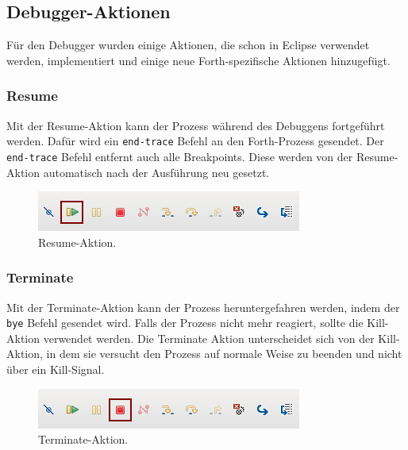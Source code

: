 \subsection{Debugger-Aktionen}

Für den Debugger wurden einige Aktionen, die schon in Eclipse verwendet werden, implementiert und einige neue Forth-spezifische Aktionen hinzugefügt.

\subsubsection{Resume}

Mit der Resume-Aktion kann der Prozess während des Debuggens fortgeführt werden. Dafür wird ein \verb!end-trace! Befehl an den Forth-Prozess gesendet. Der \verb!end-trace! Befehl entfernt auch alle Breakpoints. Diese werden von der Resume-Aktion automatisch nach der Ausführung neu gesetzt. 

\begin{figure}[H]
	\centering
		\includegraphics[scale=1]{debugger/resume.png}
		\caption{Resume-Aktion.}
		\label{fig:resume}
\end{figure}

\subsubsection{Terminate}

Mit der Terminate-Aktion kann der Prozess heruntergefahren werden, indem der \verb!bye! Befehl gesendet wird. Falls der Prozess nicht mehr reagiert, sollte die Kill-Aktion verwendet werden. Die Terminate Aktion unterscheidet sich von der Kill-Aktion, in dem sie versucht den Prozess auf normale Weise zu beenden und nicht über ein Kill-Signal.

\begin{figure}[H]
	\centering
		\includegraphics[scale=1]{debugger/terminate.png}
		\caption{Terminate-Aktion.}
		\label{fig:terminate}
\end{figure}

